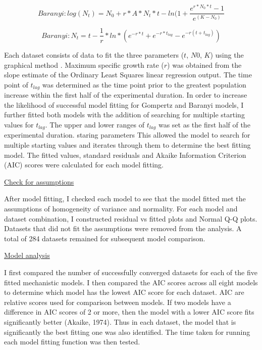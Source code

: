 \documentclass[11pt]{article}
\begin{document}
\begin{equation} 
  Baranyi: log(N_{t}) = N_{0}+r*A*N_{t}*t -ln(1 + \frac{e^{r*N_{0}*t}-1}{e^{(K - N_{0})}} 
\end{equation}

\begin{equation} 
  Baranyi: N_{t} = t - \frac{1}{r}*ln*(e^{-r*t}+e^{-r*t_{lag}}- e^{-r(t+t_{lag})}) 
\end{equation}


Each dataset consists of data to fit the three parameters (\(t\), \(N0\), \(K\)) using the graphical method \cite{holmstrom_review_2002}. Maximum specific growth rate (\(r\)) was obtained from the slope estimate of the Ordinary Least Squares linear regression output. The time point of \(t_{lag}\) was determined as the time point prior to the greatest population increase within the first half of the experimental duration. In order to increase the likelihood of successful model fitting for Gompertz and Baranyi models, I further fitted both models with the addition of searching for multiple starting values for \(t_{lag}\). The upper and lower ranges of \(t_{lag}\) was set as the first half of the experimental duration. staring parameters This allowed the model to search for multiple starting values and iterates through them to determine the best fitting model. The fitted values, standard residuals and Akaike Information Criterion (AIC) scores were calculated for each model fitting.
\vspace{\baselineskip}

\underline{Check for assumptions} 

After model fitting, I checked each model to see that the model fitted met the assumptions of homogeneity of variance and normality. For each model and dataset combination, I constructed residual vs fitted plots and Normal Q-Q plots. Datasets that did not fit the assumptions were removed from the analysis. A total of 284 datasets remained for subsequent model comparison.
\vspace{\baselineskip}

\underline{Model analysis}

I first compared the number of successfully converged datasets for each of the five fitted mechanistic models. I then compared the AIC scores across all eight models to determine which model has the lowest AIC score for each dataset. AIC are relative scores used for comparison between models. If two models have a difference in AIC scores of 2 or more, then the model with a lower AIC score fits significantly better (Akaike, 1974). Thus in each dataset, the model that is significantly the best fitting one was also identified. The time taken for running each model fitting function was then tested. 
\vspace{\baselineskip}
\end{document}
